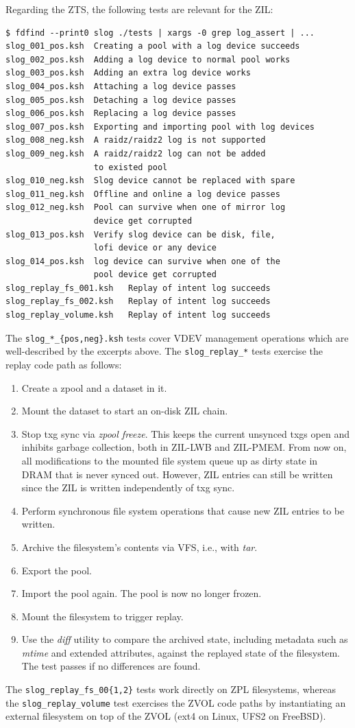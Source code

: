 \documentclass[12pt,a4paper,twoside]{book}
\begin{document}
{Regarding the ZTS, the following tests are relevant for the ZIL:
\begin{lstlisting}[style=figurepseudocode]
$ fdfind --print0 slog ./tests | xargs -0 grep log_assert | ...
slog_001_pos.ksh  Creating a pool with a log device succeeds
slog_002_pos.ksh  Adding a log device to normal pool works
slog_003_pos.ksh  Adding an extra log device works
slog_004_pos.ksh  Attaching a log device passes
slog_005_pos.ksh  Detaching a log device passes
slog_006_pos.ksh  Replacing a log device passes
slog_007_pos.ksh  Exporting and importing pool with log devices
slog_008_neg.ksh  A raidz/raidz2 log is not supported
slog_009_neg.ksh  A raidz/raidz2 log can not be added
                  to existed pool
slog_010_neg.ksh  Slog device cannot be replaced with spare
slog_011_neg.ksh  Offline and online a log device passes
slog_012_neg.ksh  Pool can survive when one of mirror log
                  device get corrupted
slog_013_pos.ksh  Verify slog device can be disk, file,
                  lofi device or any device
slog_014_pos.ksh  log device can survive when one of the
                  pool device get corrupted
slog_replay_fs_001.ksh   Replay of intent log succeeds
slog_replay_fs_002.ksh   Replay of intent log succeeds
slog_replay_volume.ksh   Replay of intent log succeeds
\end{lstlisting}
The \lstinline|slog_*_{pos,neg}.ksh| tests cover VDEV management operations which are well-described by the excerpts above.
The \lstinline{slog_replay_*} tests exercise the replay code path as follows:
\begin{enumerate}[noitemsep]
    \item Create a zpool and a dataset in it.
    \item Mount the dataset to start an on-disk ZIL chain.
    \item Stop txg sync via \textit{zpool freeze}.
        This keeps the current unsynced txgs open and inhibits garbage collection, both in ZIL-LWB and ZIL-PMEM.
        From now on, all modifications to the mounted file system queue up as dirty state in DRAM that is never synced out.
        However, ZIL entries can still be written since the ZIL is written independently of txg sync.
    \item Perform synchronous file system operations that cause new ZIL entries to be written.
    \item Archive the filesystem's contents via VFS, i.e., with \textit{tar}.
    \item Export the pool.
    \item Import the pool again. The pool is now no longer frozen.
    \item Mount the filesystem to trigger replay.
    \item Use the \textit{diff} utility to compare the archived state, including metadata such as \textit{mtime} and extended attributes, against the replayed state of the filesystem.
        The test passes if no differences are found.
\end{enumerate}
The \lstinline|slog_replay_fs_00{1,2}| tests work directly on ZPL filesystems, whereas the \lstinline|slog_replay_volume| test exercises the ZVOL code paths by instantiating an external filesystem on top of the ZVOL (ext4 on Linux, UFS2 on FreeBSD).

}
\end{document}
